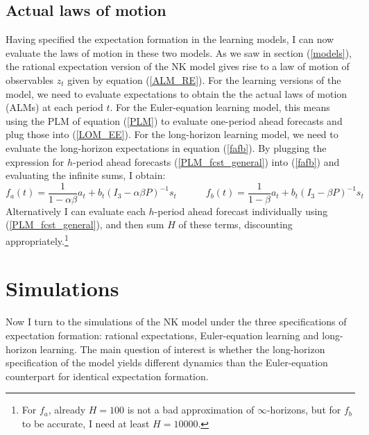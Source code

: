 \documentclass[11pt]{article}
\renewcommand{\[}{\begin{equation}}
\renewcommand{\]}{\end{equation}}
\begin{document}
\subsection{Actual laws of motion}\label{ALMs}
Having specified the expectation formation in the learning models, I can now evaluate the laws of motion in these two models. As we saw in section (\ref{models}), the rational expectation version of the NK model gives rise to a law of motion of observables $z_t$ given by equation (\ref{ALM_RE}). For the learning versions of the model, we need to evaluate expectations to obtain the the actual laws of motion (ALMs) at each period $t$. For the Euler-equation learning model, this means using the PLM of equation (\ref{PLM}) to evaluate one-period ahead forecasts and plug those into (\ref{LOM_EE}). For the long-horizon learning model, we need to evaluate the long-horizon expectations in equation (\ref{fafb}). By plugging the expression for $h$-period ahead forecasts (\ref{PLM_fcst_general}) into (\ref{fafb}) and evaluating the infinite sums, I obtain:
\begin{equation}
f_a(t) = \frac{1}{1-\alpha\beta}a_{t}  + b_{t}(I_3 - \alpha\beta P)^{-1}s_t \quad \quad \quad f_b(t) = \frac{1}{1-\beta}a_{t}  + b_{t}(I_3 - \beta P)^{-1}s_t  \label{fafb_analytical_general}
\end{equation}
Alternatively I can evaluate each $h$-period ahead forecast individually using (\ref{PLM_fcst_general}), and then sum $H$ of these terms, discounting appropriately.\footnote{For $f_a$, already $H=100$ is not a bad approximation of $\infty$-horizons, but for $f_b$ to be accurate, I need at least $H=10000$.}

\section{Simulations}	\label{simulations}
Now I turn to the simulations of the NK model under the three specifications of expectation formation: rational expectations, Euler-equation learning and long-horizon learning. The main question of interest is whether the long-horizon specification of the model yields different dynamics than the Euler-equation counterpart for identical expectation formation. 
\end{document}
